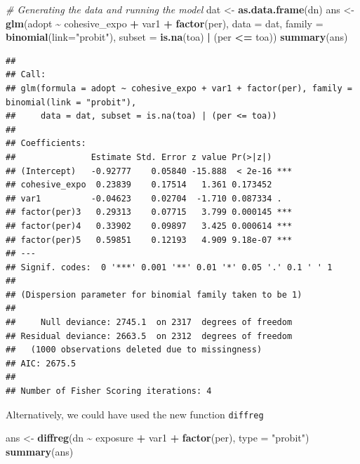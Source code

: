 \documentclass[
]{book}
\newenvironment{Shaded}{\begin{snugshade}}{\end{snugshade}}
\newcommand{\AttributeTok}[1]{\textcolor[rgb]{0.13,0.29,0.53}{#1}}
\newcommand{\CommentTok}[1]{\textcolor[rgb]{0.56,0.35,0.01}{\textit{#1}}}
\newcommand{\FunctionTok}[1]{\textcolor[rgb]{0.13,0.29,0.53}{\textbf{#1}}}
\newcommand{\NormalTok}[1]{#1}
\newcommand{\OtherTok}[1]{\textcolor[rgb]{0.56,0.35,0.01}{#1}}
\newcommand{\SpecialCharTok}[1]{\textcolor[rgb]{0.81,0.36,0.00}{\textbf{#1}}}
\newcommand{\StringTok}[1]{\textcolor[rgb]{0.31,0.60,0.02}{#1}}
\begin{document}
\begin{itemize}
\begin{Shaded}
\begin{Highlighting}[]
\CommentTok{\# Generating the data and running the model}
\NormalTok{dat }\OtherTok{\textless{}{-}} \FunctionTok{as.data.frame}\NormalTok{(dn)}
\NormalTok{ans }\OtherTok{\textless{}{-}} \FunctionTok{glm}\NormalTok{(adopt }\SpecialCharTok{\textasciitilde{}}\NormalTok{ cohesive\_expo }\SpecialCharTok{+}\NormalTok{ var1 }\SpecialCharTok{+} \FunctionTok{factor}\NormalTok{(per),}
           \AttributeTok{data =}\NormalTok{ dat,}
           \AttributeTok{family =} \FunctionTok{binomial}\NormalTok{(}\AttributeTok{link=}\StringTok{"probit"}\NormalTok{),}
           \AttributeTok{subset =} \FunctionTok{is.na}\NormalTok{(toa) }\SpecialCharTok{|}\NormalTok{ (per }\SpecialCharTok{\textless{}=}\NormalTok{ toa))}
\FunctionTok{summary}\NormalTok{(ans)}
\end{Highlighting}
\end{Shaded}

\begin{verbatim}
## 
## Call:
## glm(formula = adopt ~ cohesive_expo + var1 + factor(per), family = binomial(link = "probit"), 
##     data = dat, subset = is.na(toa) | (per <= toa))
## 
## Coefficients:
##               Estimate Std. Error z value Pr(>|z|)    
## (Intercept)   -0.92777    0.05840 -15.888  < 2e-16 ***
## cohesive_expo  0.23839    0.17514   1.361 0.173452    
## var1          -0.04623    0.02704  -1.710 0.087334 .  
## factor(per)3   0.29313    0.07715   3.799 0.000145 ***
## factor(per)4   0.33902    0.09897   3.425 0.000614 ***
## factor(per)5   0.59851    0.12193   4.909 9.18e-07 ***
## ---
## Signif. codes:  0 '***' 0.001 '**' 0.01 '*' 0.05 '.' 0.1 ' ' 1
## 
## (Dispersion parameter for binomial family taken to be 1)
## 
##     Null deviance: 2745.1  on 2317  degrees of freedom
## Residual deviance: 2663.5  on 2312  degrees of freedom
##   (1000 observations deleted due to missingness)
## AIC: 2675.5
## 
## Number of Fisher Scoring iterations: 4
\end{verbatim}

  Alternatively, we could have used the new function \texttt{diffreg}

\begin{Shaded}
\begin{Highlighting}[]
\NormalTok{ans }\OtherTok{\textless{}{-}} \FunctionTok{diffreg}\NormalTok{(dn }\SpecialCharTok{\textasciitilde{}}\NormalTok{ exposure }\SpecialCharTok{+}\NormalTok{ var1 }\SpecialCharTok{+} \FunctionTok{factor}\NormalTok{(per), }\AttributeTok{type =} \StringTok{"probit"}\NormalTok{)}
\FunctionTok{summary}\NormalTok{(ans)}
\end{Highlighting}
\end{Shaded}


\end{itemize}
\end{document}
